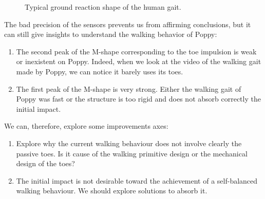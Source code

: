 \begin{figure}[!ht]
\centering
    \hfill
    \caption{Typical ground reaction shape of the human gait.}
    \label{fig:human_GRF}
\end{figure}


The bad precision of the sensors prevents us from affirming conclusions, but it can still give insights to understand the walking behavior of Poppy:
\begin{enumerate}
    \item The second peak of the M-shape corresponding to the toe impulsion is weak or inexistent on Poppy. Indeed, when we look at the video of the walking gait made by Poppy, we can notice it barely uses its toes.
    \item The first peak of the M-shape is very strong. Either the walking gait of Poppy was fast or the structure is too rigid and does not absorb correctly the initial impact.
\end{enumerate}

We can, therefore, explore some improvements axes:
\begin{enumerate}
    \item Explore why the current walking behaviour does not involve clearly the passive toes. Is it cause of the walking primitive design or the mechanical design of the toes?
    \item The initial impact is not desirable toward the achievement of a self-balanced walking behaviour. We should explore solutions to absorb it.
\end{enumerate}
